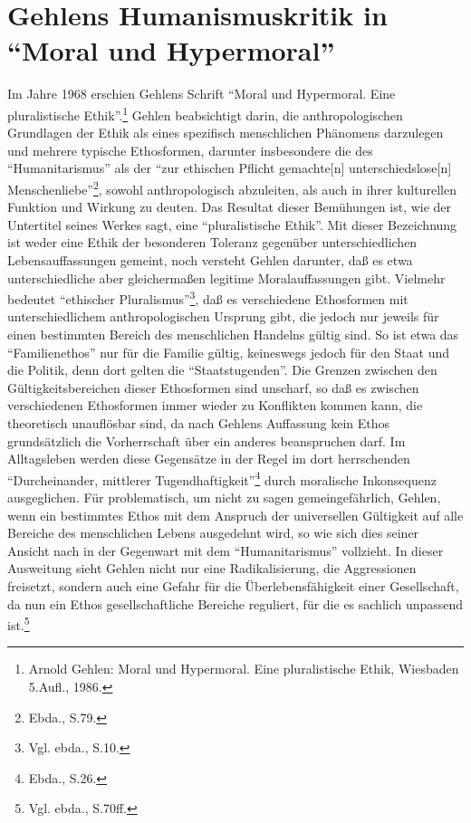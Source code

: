 \documentclass[12pt,a4paper]{article}
\begin{document}
\section{Gehlens Humanismuskritik in "`Moral und Hypermoral"'}

Im Jahre 1968 erschien Gehlens Schrift "`Moral und Hypermoral. Eine
pluralistische Ethik"'.\footnote{Arnold Gehlen: Moral und Hypermoral.
  Eine pluralistische Ethik, Wiesbaden 5.Aufl., 1986.} Gehlen
beabsichtigt darin, die anthropologischen Grundlagen der Ethik als eines
spezifisch menschlichen Phänomens darzulegen und mehrere typische
Ethosformen, darunter insbesondere die des "`Humanitarismus"' als der
"`zur ethischen Pflicht gemachte[n] unterschiedslose[n]
Menschenliebe"'\footnote{Ebda., S.79.}, sowohl anthropologisch
abzuleiten, als auch in ihrer kulturellen Funktion und Wirkung zu
deuten. Das Resultat dieser Bemühungen ist, wie der Untertitel seines
Werkes sagt, eine "`pluralistische Ethik"'. Mit dieser Bezeichnung ist
weder eine Ethik der besonderen Toleranz gegenüber unterschiedlichen
Lebensauf\/fassungen gemeint, noch versteht Gehlen darunter, daß es etwa
unterschiedliche aber gleichermaßen legitime Moralauf\/fassungen gibt.
Vielmehr bedeutet "`ethischer Pluralismus"'\footnote{Vgl. ebda., S.10.},
daß es verschiedene Ethosformen mit unterschiedlichem anthropologischen
Ursprung gibt, die jedoch nur jeweils für einen bestimmten Bereich des
menschlichen Handelns gültig sind. So ist etwa das "`Familienethos"' nur
für die Familie gültig, keineswegs jedoch für den Staat und die Politik,
denn dort gelten die "`Staatstugenden"'. Die Grenzen zwischen den
Gültigkeitsbereichen dieser Ethosformen sind unscharf, so daß es
zwischen verschiedenen Ethosformen immer wieder zu Konflikten kommen
kann, die theoretisch unauflösbar sind, da nach Gehlens Auffassung kein
Ethos grundsätzlich die Vorherrschaft über ein anderes beanspruchen
darf. Im Alltagsleben werden diese Gegensätze in der Regel im dort
herrschenden "`Durcheinander, mittlerer
Tugendhaftigkeit"'\footnote{Ebda., S.26.} durch moralische Inkonsequenz
ausgeglichen. Für problematisch, um nicht zu sagen gemeingefährlich,
Gehlen, wenn ein bestimmtes Ethos mit dem Anspruch der universellen
Gültigkeit auf alle Bereiche des menschlichen Lebens ausgedehnt wird, so
wie sich dies seiner Ansicht nach in der Gegenwart mit dem
"`Humanitarismus"' vollzieht. In dieser Ausweitung sieht Gehlen nicht
nur eine Radikalisierung, die Aggressionen freisetzt, sondern auch eine
Gefahr für die Überlebensfähigkeit einer Gesellschaft, da nun ein Ethos
gesellschaftliche Bereiche reguliert, für die es sachlich unpassend
ist.\footnote{Vgl. ebda., S.70ff.}
\end{document}
